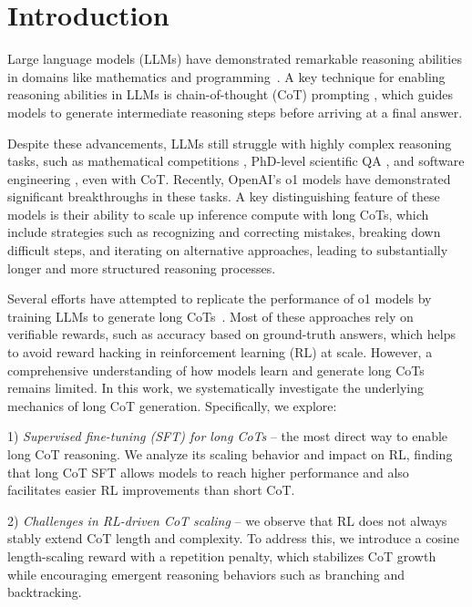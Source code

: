 \section{Introduction}

Large language models (LLMs) \citep{brown2020language,
touvron2023llama,anthropic2023claude,openai2023gpt4} have demonstrated remarkable reasoning abilities in domains like mathematics \citep{cobbe2021gsm8k} and programming~\citep{chen2021humaneval}. A key technique for enabling reasoning abilities in LLMs is chain-of-thought (CoT) prompting \citep{wei2022cot}, which guides models to generate intermediate reasoning steps before arriving at a final answer.

Despite these advancements, LLMs still struggle with highly complex reasoning tasks, such as mathematical competitions \citep{hendrycks2021math}, PhD-level scientific QA \citep{rein2024gpqa}, and software engineering \citep{jimenez2024swebench}, even with CoT. Recently, OpenAI's o1 models \citep{openai2024o1} have demonstrated significant breakthroughs in these tasks. A key distinguishing feature of these models is their ability to scale up inference compute with long CoTs, which include strategies such as recognizing and correcting mistakes, breaking down difficult steps, and iterating on alternative approaches, leading to substantially longer and more structured reasoning processes.

Several efforts have attempted to replicate the performance of o1 models by training LLMs to generate long CoTs~\citep{qwen2024qwq, deepseekai2025r1, kimi2025k15, tinyzero, zeng2025simplerl}. Most of these approaches rely on verifiable rewards, such as accuracy based on ground-truth answers, which helps to avoid reward hacking in reinforcement learning (RL) at scale. However, a comprehensive understanding of how models learn and generate long CoTs remains limited. In this work, we systematically investigate the underlying mechanics of long CoT generation. Specifically, we explore:

1) \textit{Supervised fine-tuning (SFT) for long CoTs} -- the most direct way to enable long CoT reasoning. We analyze its scaling behavior and impact on RL, finding that long CoT SFT allows models to reach higher performance and also facilitates easier RL improvements than short CoT.

2) \textit{Challenges in RL-driven CoT scaling} -- we observe that RL does not always stably extend CoT length and complexity. To address this, we introduce a cosine length-scaling reward with a repetition penalty, which stabilizes CoT growth while encouraging emergent reasoning behaviors such as branching and backtracking.

